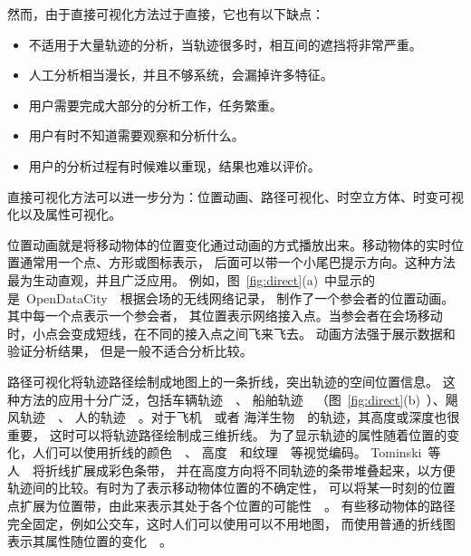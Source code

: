 \documentclass[12pt,twocolumn]{article}
\begin{document}
然而，由于直接可视化方法过于直接，它也有以下缺点：

\begin{itemize}
	\item 不适用于大量轨迹的分析，当轨迹很多时，相互间的遮挡将非常严重。
	\item 人工分析相当漫长，并且不够系统，会漏掉许多特征。
	\item 用户需要完成大部分的分析工作，任务繁重。
	\item 用户有时不知道需要观察和分析什么。
	\item 用户的分析过程有时候难以重现，结果也难以评价。
\end{itemize}

直接可视化方法可以进一步分为：位置动画、路径可视化、时空立方体、时变可视化以及属性可视化。

位置动画就是将移动物体的位置变化通过动画的方式播放出来。移动物体的实时位置通常用一个点、方形或图标表示，
后面可以带一个小尾巴提示方向。这种方法最为生动直观，并且广泛应用。
例如，图~\ref{fig:direct}(a)~中显示的是~OpenDataCity~\citep{OpenDataCity2013}~根据会场的无线网络记录，
制作了一个参会者的位置动画。其中每一个点表示一个参会者，
其位置表示网络接入点。当参会者在会场移动时，小点会变成短线，在不同的接入点之间飞来飞去。
动画方法强于展示数据和验证分析结果，
但是一般不适合分析比较。

路径可视化将轨迹路径绘制成地图上的一条折线，突出轨迹的空间位置信息。
这种方法的应用十分广泛，包括车辆轨迹~\citep{GuoWYZY2011,LiuGLLQN2011}~、
船舶轨迹~\citep{LundbladEH2009}~（图~\ref{fig:direct}(b)~）、飓风轨迹~\citep{WangGYY2011}~、
人的轨迹~\citep{BouvierO2008,AndrienkoA2008a}~。对于飞机~\citep{HurterTC2009}~或者
海洋生物~\citep{WareAPW2006}~的轨迹，其高度或深度也很重要，
这时可以将轨迹路径绘制成三维折线。
为了显示轨迹的属性随着位置的变化，人们可以使用折线的颜色~\citep{GuoWYZY2011}~、
高度~\citep{AndrienkoA2008a}~和纹理~\citep{WareAPW2006}~等视觉编码。
Tominski~等人~\citep{TominskiSAA2012}~将折线扩展成彩色条带，
并在高度方向将不同轨迹的条带堆叠起来，以方便轨迹间的比较。有时为了表示移动物体位置的不确定性，
可以将某一时刻的位置点扩展为位置带，由此来表示其处于各个位置的可能性~\citep{StollKEB2013}~。
有些移动物体的路径完全固定，例如公交车，这时人们可以使用可以不用地图，
而使用普通的折线图表示其属性随位置的变化~\citep{WoernerE2012}~。
\end{document}
